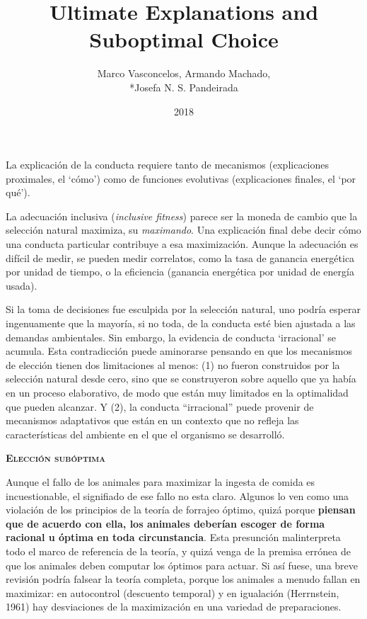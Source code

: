 \documentclass[a4paper,12pt]{article}
\title{Ultimate Explanations and Suboptimal Choice}
\author{Marco Vasconcelos, Armando Machado,\\*Josefa N. S. Pandeirada}
\date{2018}
\begin{document}
{\scshape\bfseries \maketitle}

La explicación de la conducta requiere tanto de mecanismos (explicaciones proximales, el `cómo') como de funciones evolutivas (explicaciones finales, el `por qué').

La adecuación inclusiva ({\itshape inclusive fitness}) parece ser la moneda de cambio que la selección natural maximiza, su {\slshape maximando}. Una explicación final debe decir cómo una conducta particular contribuye a esa maximización. Aunque la adecuación es difícil de medir, se pueden medir correlatos, como la tasa de ganancia energética por unidad de tiempo, o la eficiencia (ganancia energética por unidad de energía usada).

Si la toma de decisiones fue esculpida por la selección natural, uno podría esperar ingenuamente que la mayoría, si no toda, de la conducta esté bien ajustada a las demandas ambientales. Sin embargo, la evidencia de conducta `irracional' se acumula. Esta contradicción puede aminorarse pensando en que los mecanismos de elección tienen dos limitaciones al menos: (1) no fueron construidos por la selección natural desde cero, sino que se construyeron sobre aquello que ya había en un proceso elaborativo, de modo que están muy limitados en la optimalidad que pueden alcanzar. Y (2), la conducta ``irracional'' puede provenir de mecanismos adaptativos que están en un contexto que no refleja las características del ambiente en el que el organismo se desarrolló.

{\scshape\bfseries Elección subóptima}

Aunque el fallo de los animales para maximizar la ingesta de comida es incuestionable, el signifiado de ese fallo no esta claro. Algunos lo ven como una violación de los principios de la teoría de forrajeo óptimo, quizá porque {\bfseries piensan que de acuerdo con ella, los animales deberían escoger de forma racional u óptima en toda circunstancia}. Esta presunción malinterpreta todo el marco de referencia de la teoría, y quizá venga de la premisa errónea de que los animales deben computar los óptimos para actuar. Si así fuese, una breve revisión podría falsear la teoría completa, porque los animales a menudo fallan en maximizar: en autocontrol (descuento temporal) y en igualación (Herrnstein, 1961) hay desviaciones de la maximización en una variedad de preparaciones. 
\end{document}
